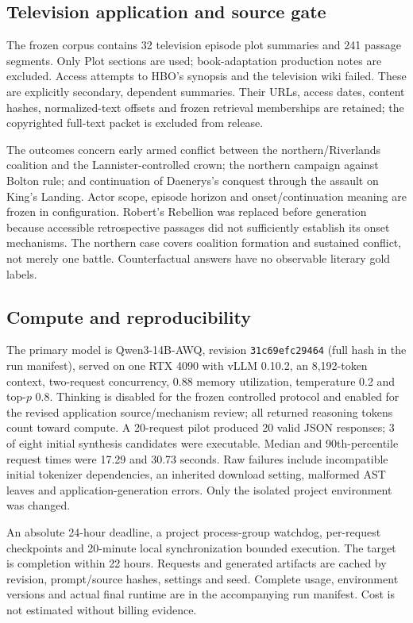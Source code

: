 \documentclass{svproc}
\begin{document}
\subsection{Television application and source gate}
The frozen corpus contains 32 television episode plot summaries and 241 passage segments. Only Plot sections are used; book-adaptation production notes are excluded. Access attempts to HBO's synopsis and the television wiki failed. These are explicitly secondary, dependent summaries. Their URLs, access dates, content hashes, normalized-text offsets and frozen retrieval memberships are retained; the copyrighted full-text packet is excluded from release.

The outcomes concern early armed conflict between the northern/Riverlands coalition and the Lannister-controlled crown; the northern campaign against Bolton rule; and continuation of Daenerys's conquest through the assault on King's Landing. Actor scope, episode horizon and onset/continuation meaning are frozen in configuration. Robert's Rebellion was replaced before generation because accessible retrospective passages did not sufficiently establish its onset mechanisms. The northern case covers coalition formation and sustained conflict, not merely one battle. Counterfactual answers have no observable literary gold labels.

\subsection{Compute and reproducibility}
The primary model is Qwen3-14B-AWQ, revision \texttt{31c69efc29464} (full hash in the run manifest), served on one RTX 4090 with vLLM 0.10.2, an 8,192-token context, two-request concurrency, 0.88 memory utilization, temperature 0.2 and top-$p$ 0.8. Thinking is disabled for the frozen controlled protocol and enabled for the revised application source/mechanism review; all returned reasoning tokens count toward compute. A 20-request pilot produced 20 valid JSON responses; 3 of eight initial synthesis candidates were executable. Median and 90th-percentile request times were 17.29 and 30.73 seconds. Raw failures include incompatible initial tokenizer dependencies, an inherited download setting, malformed AST leaves and application-generation errors. Only the isolated project environment was changed.

An absolute 24-hour deadline, a project process-group watchdog, per-request checkpoints and 20-minute local synchronization bounded execution. The target is completion within 22 hours. Requests and generated artifacts are cached by revision, prompt/source hashes, settings and seed. Complete usage, environment versions and actual final runtime are in the accompanying run manifest. Cost is not estimated without billing evidence.
\end{document}
